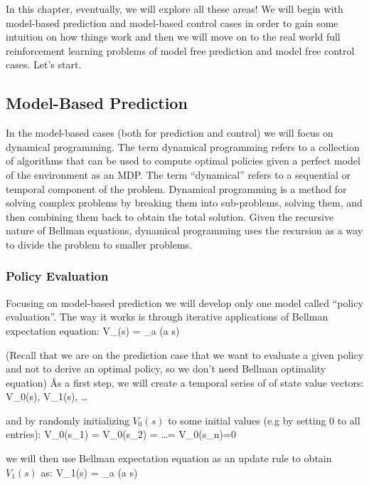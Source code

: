In this chapter, eventually, we will explore all these areas! We will begin with model-based prediction and
model-based control cases in order to gain some intuition on how things work and then we will move on to the real
world full reinforcement learning problems of model free prediction and model free control cases. Let's start.

\subsection{Model-Based Prediction}

In the model-based cases (both for prediction and control) we will focus on dynamical programming. The term dynamical
programming refers to a collection of algorithms that can be used to compute optimal policies given a perfect model
of the environment as an MDP. The term ``dynamical'' refers to a sequential or temporal component of the problem.
Dynamical programming is a method for solving complex problems by breaking them into sub-problems, solving them, and
then combining them back to obtain the total solution. Given the recursive nature of Bellman equations, dynamical
programming uses the recursion as a way to divide the problem to smaller problems.

\subsubsection{Policy Evaluation}

Focusing on model-based prediction we will develop only one model called ``policy evaluation''. The way it works is
through iterative applications of Bellman expectation equation:
\bse
V_{\pi}(s) = \sum_{a} \pi(a \mid s) 
\ese

(Recall that we are on the prediction case that we want to evaluate a given policy and not to derive an optimal
policy, so we don't need Bellman optimality equation) \v

As a first step, we will create a temporal series of of state value vectors:
\bse
V_0(s), V_1(s), \ldots
\ese

and by randomly initializing $V_0(s)$ to some initial values (e.g by setting 0 to all entries):
\bse
V_0(s_1) = V_0(s_2) = \ldots = V_0(s_n)=0
\ese

we will then use Bellman expectation equation as an update rule to obtain $V_1(s)$ as:
\bse
V_{1}(s) = \sum_{a} \pi(a \mid s) 
\ese

